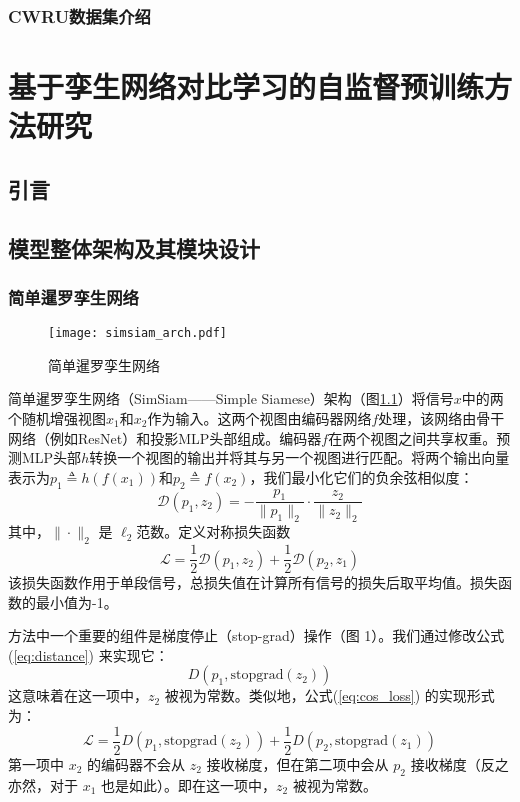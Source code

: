 \documentclass[master]{thesis-uestc}
\begin{document}
\subsection{CWRU数据集介绍}

\chapter{基于孪生网络对比学习的自监督预训练方法研究}
\section{引言}
\section{模型整体架构及其模块设计}
\subsection{简单暹罗孪生网络}
\begin{figure}[h]
    \texttt{[image: simsiam\_arch.pdf]}
    \caption{简单暹罗孪生网络}
    \label{simsiam_arch}
\end{figure}
简单暹罗孪生网络（SimSiam——Simple Siamese）架构（图\ref{simsiam_arch}）将信号$x$中的两个随机增强视图$x_1$和$x_2$作为输入。这两个视图由编码器网络$f$处理，该网络由骨干网络（例如ResNet）和投影MLP头部组成。编码器$f$在两个视图之间共享权重。预测MLP头部$h$转换一个视图的输出并将其与另一个视图进行匹配。将两个输出向量表示为$p_1 \triangleq h(f(x_1))$和$p_2 \triangleq f(x_2)$，我们最小化它们的负余弦相似度：
\begin{equation}
    \mathcal{D}(p_1, z_2) = -\frac{p_1}{\|p_1\|_2} \cdot \frac{z_2}{\|z_2\|_2}
    \label{eq:distance}
\end{equation}  
其中，$\|\cdot\|_2$ 是 $\ell_2$范数。定义对称损失函数
\begin{equation}
    \mathcal{L} = \frac{1}{2} \mathcal{D}(p_{1}, z_{2}) + \frac{1}{2} \mathcal{D}(p_{2}, z_{1})
\label{eq:cos_loss}
\end{equation}
该损失函数作用于单段信号，总损失值在计算所有信号的损失后取平均值。损失函数的最小值为-1。

方法中一个重要的组件是梯度停止（stop-grad）操作（图 1）。我们通过修改公式(\ref{eq:distance}) 来实现它：
\begin{equation}
    D(p_1, \text{stopgrad}(z_2))
\label{eq:stopgrad}
\end{equation}
这意味着在这一项中，\( z_2 \) 被视为常数。类似地，公式(\ref{eq:cos_loss}) 的实现形式为：
\begin{equation}
\mathcal{L} = \frac{1}{2} D(p_1, \text{stopgrad}(z_2)) + \frac{1}{2} D(p_2, \text{stopgrad}(z_1))
\label{eq:cos_loss_stopgrad}
\end{equation}
第一项中 \( x_2 \) 的编码器不会从 \( z_2 \) 接收梯度，但在第二项中会从 \( p_2 \) 接收梯度（反之亦然，对于 \( x_1 \) 也是如此）。即在这一项中，\( z_2 \) 被视为常数。
\end{document}
